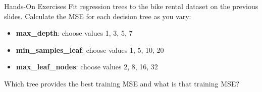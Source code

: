 \documentclass[ignorenonframetext,xcolor=x11names]{beamer}
\begin{document}
\begin{frame}{Hands-On Exercises}
Fit regression trees to the bike rental dataset on the previous slides. Calculate the MSE for each decision tree as you vary:
\begin{itemize}
   \item \textbf{max\_depth}: choose values 1, 3, 5, 7
   \item \textbf{min\_samples\_leaf}: choose values 1, 5, 10, 20
   \item \textbf{max\_leaf\_nodes}: choose values 2, 8, 16, 32
\end{itemize}
Which tree provides the best training MSE and what is that training MSE?
\end{frame}




\end{document}
